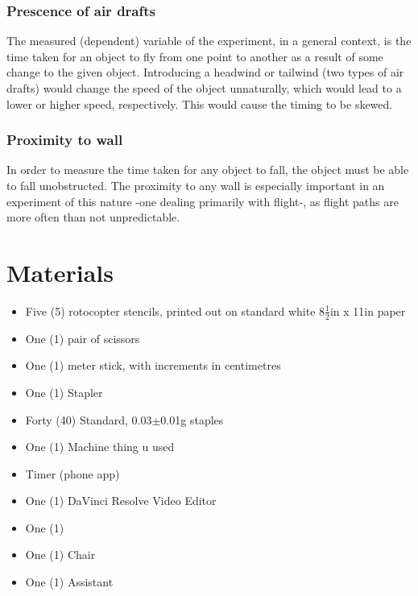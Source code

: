 \documentclass[]{article}
\begin{document}
\subsubsection{Prescence of air drafts}
The measured (dependent) variable of the experiment, in a general context, is the time taken for an object to fly from one point to another as a result of some change to the given object. Introducing a headwind or tailwind (two types of air drafts) would change the speed of the object unnaturally, which would lead to a lower or higher speed, respectively. This would cause the timing to be skewed.

\subsubsection{Proximity to wall}
In order to measure the time taken for any object to fall, the object must be able to fall unobstructed. The proximity to any wall is especially important in an experiment of this nature -one dealing primarily with flight-, as flight paths are more often than not unpredictable.


\section{Materials}
\begin{itemize}
    \item Five (5) rotocopter stencils, printed out on standard white $8\frac{1}{2}$in x 11in paper
    \item One (1) pair of scissors
    \item One (1) meter stick, with increments in centimetres
    \item One (1) Stapler 
    \item Forty (40) Standard, 0.03$\pm$0.01g staples
    \item One (1) Machine thing u used 
    \item Timer (phone app) 
    \item One (1) DaVinci Resolve Video Editor
    \item One (1)
    \item One (1) Chair
    \item One (1) Assistant
\end{itemize}
\end{document}
